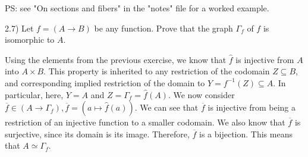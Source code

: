 


PS: see "On sections and fibers" in the "notes" file for a worked example.



2.7) Let $f = (A \to B)$ be any function. Prove that the graph $\Gamma_f$ of $f$ is isomorphic to $A$.

Using the elements from the previous exercise, we know that $\hat{f}$ is injective from $A$ into $A \times B$. This property is inherited to any restriction of the codomain $Z \subseteq B$, and corresponding implied restriction of the domain to $Y = f^{-1}(Z) \subseteq A$. In particular, here, $Y = A$ and $Z = \Gamma_f = \hat{f}(A)$. We now consider $\overline{f} \in (A \to \Gamma_f), \overline{f} = (a \mapsto \hat{f}(a))$. We can see that $\overline{f}$ is injective from being a restriction of an injective function to a smaller codomain. We also know that $\overline{f}$ is surjective, since its domain is its image. Therefore, $\overline{f}$ is a bijection. This means that $A \simeq \Gamma_f$.



